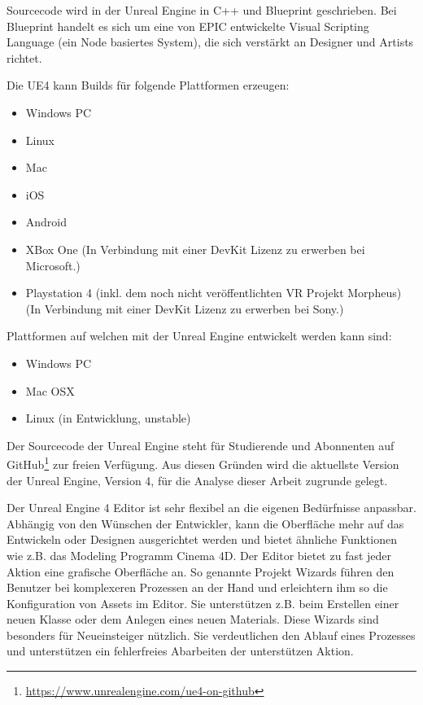 \documentclass[pagesize, paper=a4, fontsize=12pt, titlepage=true, headings=small, headnosepline, abstractoff, liststotoc, nochapterprefix, plainheadsepline, twoside]{scrreprt}
\begin{document}
Sourcecode wird in der Unreal Engine in C++ und Blueprint geschrieben. Bei Blueprint handelt es sich um eine von EPIC entwickelte Visual Scripting Language (ein Node basiertes System), die sich verstärkt an Designer und Artists richtet.

Die UE4 kann Builds für folgende Plattformen erzeugen:
\begin{itemize}
\item Windows PC
\item Linux
\item Mac
\item iOS
\item Android
\item XBox One (In Verbindung mit einer DevKit Lizenz zu erwerben bei Microsoft.)
\item Playstation 4 (inkl. dem noch nicht veröffentlichten VR Projekt Morpheus) (In Verbindung mit einer DevKit Lizenz zu erwerben bei Sony.)
\end{itemize}

Plattformen auf welchen mit der Unreal Engine entwickelt werden kann sind:
\begin{itemize}
\item Windows PC
\item Mac OSX
\item Linux (in Entwicklung, unstable)
\end{itemize}

Der Sourcecode der Unreal Engine steht für Studierende und Abonnenten auf GitHub\footnote{\url{https://www.unrealengine.com/ue4-on-github}} zur freien Verfügung. Aus diesen Gründen wird die aktuellste Version der Unreal Engine, Version 4, für die Analyse dieser Arbeit zugrunde gelegt.

Der Unreal Engine 4 Editor ist sehr flexibel an die eigenen Bedürfnisse anpassbar. Abhängig von den Wünschen der Entwickler, kann die Oberfläche mehr auf das Entwickeln oder Designen ausgerichtet werden und bietet ähnliche Funktionen wie z.B. das Modeling Programm Cinema 4D. Der Editor bietet zu fast jeder Aktion eine grafische Oberfläche an. So genannte Projekt Wizards führen den Benutzer bei komplexeren Prozessen an der Hand und erleichtern ihm so die Konfiguration von Assets im Editor. Sie unterstützen z.B. beim Erstellen einer neuen Klasse oder dem Anlegen eines neuen Materials. Diese Wizards sind besonders für Neueinsteiger nützlich. Sie verdeutlichen den Ablauf eines Prozesses und unterstützen ein fehlerfreies Abarbeiten der unterstützen Aktion.
\end{document}
